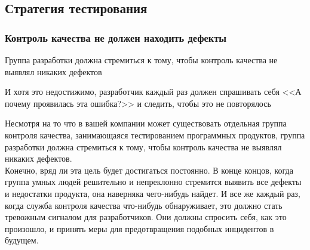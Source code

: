 \documentclass{../industrial-development}
\begin{document}
\subsection{Стратегия тестирования}
\begin{frame} \frametitle{Контроль качества не должен находить дефекты}
  \begin{block}{}
	Группа разработки должна стремиться к тому, чтобы контроль качества не выявлял никаких дефектов
  \end{block}
	И хотя это недостижимо, разработчик каждый раз должен спрашивать себя <<А почему проявилась эта ошибка?>> и следить, чтобы это не повторялось
\end{frame}
\lecturenotes
Несмотря на то что в вашей компании может существовать отдельная группа контроля качества, занимающаяся тестированием программных продуктов, группа разработки должна стремиться к тому, чтобы контроль качества не выявлял никаких дефектов.\\
Конечно, вряд ли эта цель будет достигаться постоянно. В конце концов, когда группа умных людей решительно и непреклонно стремится выявить все дефекты и недостатки продукта, она наверняка чего-нибудь найдет. И все же каждый раз, когда служба контроля качества что-нибудь обнаруживает, это должно стать тревожным сигналом для разработчиков. Они должны спросить себя, как это произошло, и принять меры для предотвращения подобных инцидентов в будущем.
\end{document}
